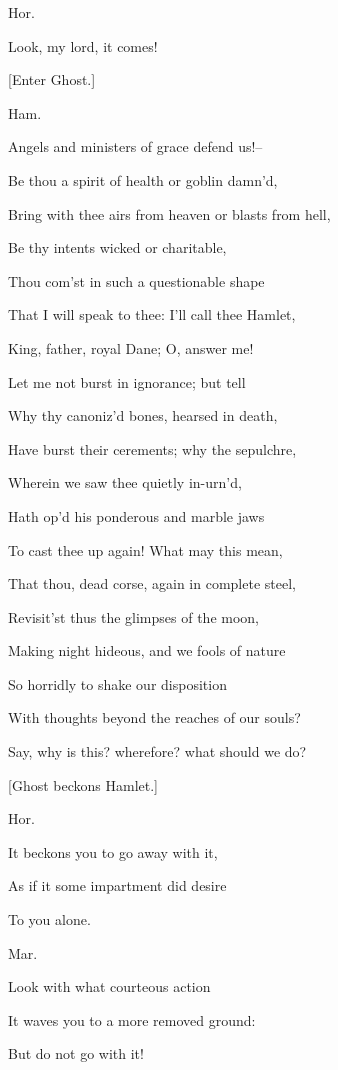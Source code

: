 \documentclass[12pt]{book}
\begin{document}
Hor.

Look, my lord, it comes!



[Enter Ghost.]



Ham.

Angels and ministers of grace defend us!--

Be thou a spirit of health or goblin damn'd,

Bring with thee airs from heaven or blasts from hell,

Be thy intents wicked or charitable,

Thou com'st in such a questionable shape

That I will speak to thee: I'll call thee Hamlet,

King, father, royal Dane; O, answer me!

Let me not burst in ignorance; but tell

Why thy canoniz'd bones, hearsed in death,

Have burst their cerements; why the sepulchre,

Wherein we saw thee quietly in-urn'd,

Hath op'd his ponderous and marble jaws

To cast thee up again! What may this mean,

That thou, dead corse, again in complete steel,

Revisit'st thus the glimpses of the moon,

Making night hideous, and we fools of nature

So horridly to shake our disposition

With thoughts beyond the reaches of our souls?

Say, why is this? wherefore? what should we do?



[Ghost beckons Hamlet.]



Hor.

It beckons you to go away with it,

As if it some impartment did desire

To you alone.



Mar.

Look with what courteous action

It waves you to a more removed ground:

But do not go with it!
\end{document}
